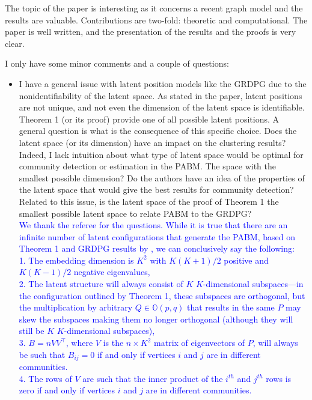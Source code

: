 \documentclass[
]{article}
\begin{document}
The topic of the paper is interesting as it concerns a recent graph
model and the results are valuable. Contributions are two-fold:
theoretic and computational. The paper is well written, and the
presentation of the results and the proofs is very clear.

I only have some minor comments and a couple of questions:

\begin{itemize}
\item
  I have a general issue with latent position models like the GRDPG due
  to the nonidentifiability of the latent space. As stated in the paper,
  latent positions are not unique, and not even the dimension of the
  latent space is identifiable. Theorem 1 (or its proof) provide one of
  all possible latent positions. A general question is what is the
  consequence of this specific choice. Does the latent space (or its
  dimension) have an impact on the clustering results? Indeed, I lack
  intuition about what type of latent space would be optimal for
  community detection or estimation in the PABM. The space with the
  smallest possible dimension? Do the authors have an idea of the
  properties of the latent space that would give the best results for
  community detection? Related to this issue, is the latent space of the
  proof of Theorem 1 the smallest possible latent space to relate PABM
  to the GRDPG?\\
  \textcolor{blue}{
  We thank the referee for the questions. 
  While it is true that there are an infinite number of latent configurations that generate the PABM, based on Theorem 1 and GRDPG results by \citet{rubindelanchy2017statistical}, we can conclusively say the following: 
  \\1. The embedding dimension is $K^2$ with $K (K + 1) / 2$ positive and $K (K - 1) / 2$ negative eigenvalues, 
  \\2. The latent structure will always consist of $K$ $K$-dimensional subspaces---in the configuration outlined by Theorem 1, these subspaces are orthogonal, but the multiplication by arbitrary $Q \in \mathbb{O}(p, q)$ that results in the same $P$ may skew the subspaces making them no longer orthogonal (although they will still be $K$ $K$-dimensional subspaces), 
  \\3. $B = n V V^\top$, where $V$ is the $n \times K^2$ matrix of eigenvectors of $P$, will always be such that $B_{ij} = 0$ if and only if vertices $i$ and $j$ are in different communities. 
  \\4. The rows of $V$ are such that the inner product of the $i^{th}$ and $j^{th}$ rows is zero if and only if vertices $i$ and $j$ are in different communities. 
}
\end{itemize}
\end{document}
